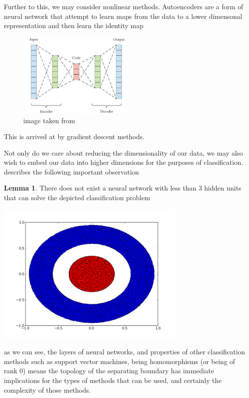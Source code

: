 \documentclass[a4paper,12pt]{report}
\theoremstyle{definition}
\newtheorem{lemma}[definition]{Lemma}
\begin{document}
 
 Further to this, we may consider nonlinear methods. Autoencoders are a form of neural network that attempt to learn maps from the data to a lower dimensonal representation and then learn the identity map
  
 \begin{figure}[h]
\begin{center}
    \includegraphics[width=0.5\textwidth]{autoencoder.png} 
    \caption{image taken from \cite{autoencoder} }
  \end{center}
 
 \end{figure}
This is arrived at by gradient descent methods. 

Not only do we care about reducing the dimensionality of our data, we may also wish to embed our data into higher dimensions for the purposes of classification.\cite{NNTop} describes the following important observation

 \begin{minipage}{0.5\textwidth}
 \begin{lemma}
 There does not exist a neural network with less than 3 hidden units that can solve the depicted classification problem
 \end{lemma}
 \end{minipage}\begin{minipage}{0.5\textwidth}
 \centering
 \includegraphics[width=0.7\textwidth]{topology_base.png}
 \end{minipage}
 as we can see, the layers of neural networks, and properties of other classification methods such as support vector machines, being homomorphisms (or being of rank 0) means the topology of the separating boundary has immediate implications for the types of methods that can be used, and certainly the complexity of those methods.
\end{document}
